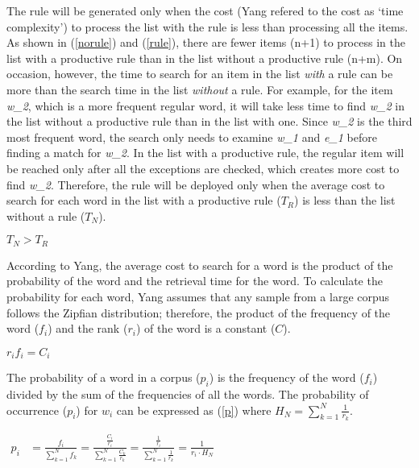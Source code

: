The rule will be generated only when the cost (Yang refered to the cost as `time complexity') to process the list with the rule is less
than processing all the items. As shown in (\ref{norule}) and (\ref{rule}), there are fewer items (n+1) to process in the list with a productive rule than in the list without a productive rule (n+m). On occasion, however, the time to search for an item in the list \textit{with} a rule can be more than the search time in the list \textit{without} a rule. For example, for the item \textit{w_2}, which is a more frequent regular word, it will take less time to find \textit{w_2} in the list without a productive rule than in the list with one. Since \textit{w_2} is the third most frequent word, the search only needs to examine \textit{w_1} and \textit{e_1} before finding a match for \textit{w_2}. In the list with a productive rule, the regular item will be reached only after all the exceptions are checked, which creates more cost to find \textit{w_2}. Therefore, the rule will be deployed only when the average cost to search for each word in the list with a productive rule ($T_R$) is less than the list without a rule ($T_N$). 
\begin{exe}
\ex $T_{N} > T_{R}$
\end{exe}

According to Yang, the average cost to search for a word is the product of the probability of the word and the retrieval time for the word. To calculate the probability for each word, Yang assumes that any sample from a large corpus follows the Zipfian distribution; therefore, the product of the frequency of the word ($f_i$) and the rank ($r_i$) of the word is a constant ($C$).

\begin{exe}
\ex \label{Zipfian}
$r_if_i  = C_i$
\end{exe}
The probability of a word in a corpus ($p_i$) is the frequency of the word ($f_i$) divided by the sum of the frequencies of all the words. The probability of occurrence ($p_i$) for $w_i$ can be expressed as (\ref{p}) where $H_N = \displaystyle\sum_{k=1}^N \frac{1}{r_k}$.

\begin{exe}
\ex \label{p}
$\begin{aligned}
p_i &  = \frac{f_i}{\displaystyle\sum_{k=1}^N f_k} =\frac{\frac{C_i}{r_i}}{\displaystyle\sum_{k=1}^N \frac{C_k}{r_k}}=\frac{\frac{1}{r_i}}{\displaystyle\sum_{k=1}^N \frac{1}{r_k}}=\frac{1}{r_i\cdot H_N}&
\end{aligned}$
\end{exe}


